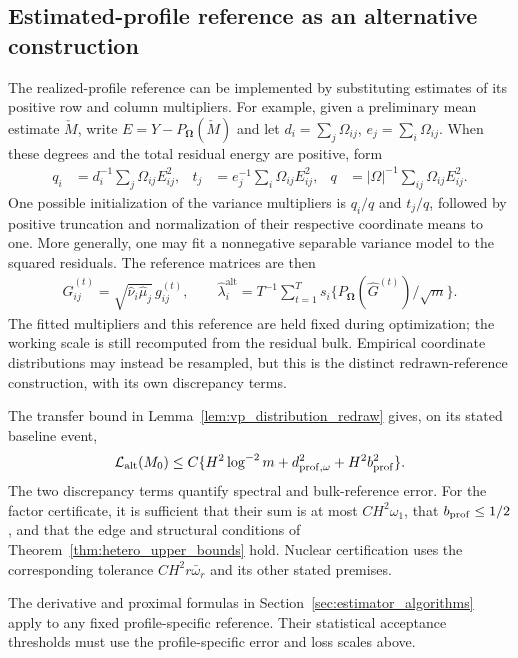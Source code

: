 \documentclass[numsec,webpdf,modern,large,namedate]{oup-authoring-template}
\theoremstyle{plain}
\theoremstyle{remark}
\newcommand{\bOmega}{\bm{\Omega}}
\newif\ifmarkchanges
\newenvironment{revision}{\begingroup\ifmarkchanges\color{red}\fi}{\endgroup}
\begin{document}
\begin{revision}
\subsection{Estimated-profile reference as an alternative construction}
\label{sec:estimated_profiles}
The realized-profile reference can be implemented by substituting estimates
of its positive row and column multipliers.  For example, given a preliminary
mean estimate $\check M$, write $E=Y-P_{\bOmega}(\check M)$ and let
$d_i=\sum_j\Omega_{ij}$, $e_j=\sum_i\Omega_{ij}$.  When these degrees and
the total residual energy are positive, form
\begin{align*}
 q_i&=d_i^{-1}\sum_j\Omega_{ij}E_{ij}^2,&
 t_j&=e_j^{-1}\sum_i\Omega_{ij}E_{ij}^2,&
 q&=|\Omega|^{-1}\sum_{ij}\Omega_{ij}E_{ij}^2.
\end{align*}
One possible initialization of the variance multipliers is $q_i/q$ and
$t_j/q$, followed by positive truncation and normalization of their respective
coordinate means to one.  More generally, one may fit a nonnegative separable
variance model to the squared residuals.  The reference matrices are then
\begin{align}
 \widehat G^{(t)}_{ij}
 =\sqrt{\widehat\nu_i\widehat\mu_j}\,g_{ij}^{(t)},\qquad
 \widehat\lambda_i^{\mathrm{alt}}
 =T^{-1}\sum_{t=1}^{T}s_i\{P_{\bOmega}(\widehat G^{(t)})/\sqrt m\}.
 \label{eq:estimated_profile_reference}
\end{align}
The fitted multipliers and this reference are held fixed during optimization;
the working scale is still recomputed from the residual bulk.  Empirical
coordinate distributions may instead be resampled, but this is the distinct
redrawn-reference construction, with its own discrepancy terms.

The transfer bound in Lemma~\ref{lem:vp_distribution_redraw} gives,
on its stated baseline event,
\begin{align*}
 \mathcal L_{\mathrm{alt}}(M_0)
 \le C\{H^2\log^{-2}m+d_{\rm prof,\omega}^2
                         +H^2b_{\rm prof}^2\}.
\end{align*}
The two discrepancy terms quantify spectral and bulk-reference error.
For the factor
certificate, it is sufficient that their sum is at most $CH^2\omega_1$,
that $b_{\rm prof}\le1/2$, and that the edge and structural conditions
of Theorem~\ref{thm:hetero_upper_bounds} hold.  Nuclear certification uses the
corresponding tolerance $CH^2r\bar\omega_r$ and its other stated premises.


The derivative and proximal formulas in Section~\ref{sec:estimator_algorithms}
apply to any fixed profile-specific reference.  Their statistical acceptance
thresholds must use the profile-specific error and loss scales above.
\end{revision}
\end{document}
